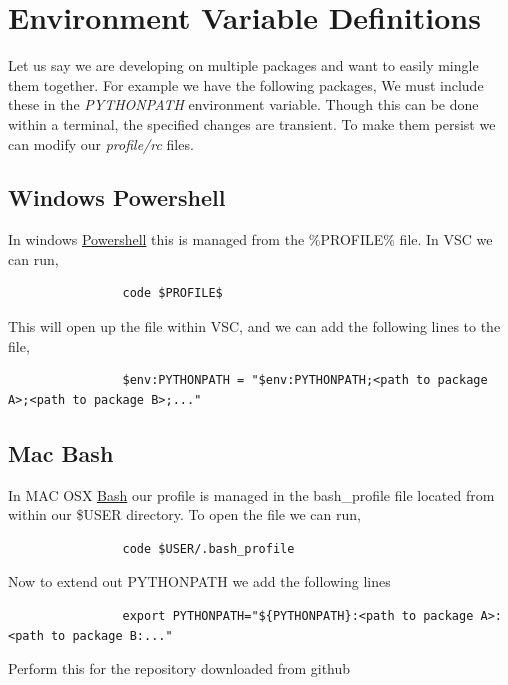 \documentclass[10pt,a4paper]{article}
\begin{document}
	\section{Environment Variable Definitions}
		Let us say we are developing on multiple packages and want to easily mingle them together. For example we have the following packages,
		We must include these in the \textit{PYTHONPATH} environment variable. Though this can be done within a terminal, the specified changes are transient. To make them persist we can modify our \textit{profile/rc} files.
		\subsection{Windows Powershell}
			In windows \href{https://docs.microsoft.com/en-us/powershell/scripting/overview?view=powershell-7}{Powershell} this is managed from the \%PROFILE\% file. In VSC we can run,
			\begin{verbatim}
				code $PROFILE$
			\end{verbatim}
			This will open up the file within VSC, and we can add the following lines to the file,
			\begin{verbatim}
				$env:PYTHONPATH = "$env:PYTHONPATH;<path to package A>;<path to package B>;..."
			\end{verbatim}
		\subsection{Mac Bash}
			In MAC OSX \href{https://help.ubuntu.com/community/Beginners/BashScripting}{Bash} our profile is managed in the bash\_profile file located from within our \$USER directory. To open the file we can run,
			\begin{verbatim}
				code $USER/.bash_profile
			\end{verbatim}
			Now to extend out PYTHONPATH we add the following lines
			\begin{verbatim}
				export PYTHONPATH="${PYTHONPATH}:<path to package A>:<path to package B:..."
			\end{verbatim}
		Perform this for the repository downloaded from github
\end{document}
